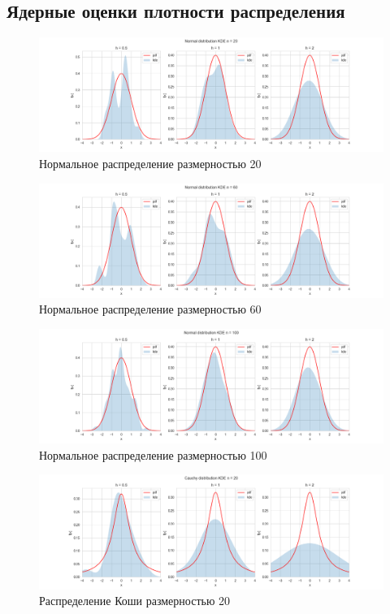 \documentclass[a4paper,14pt]{article}
\begin{document}
	\subsection{Ядерные оценки плотности распределения}
	\begin{figure}[H]
		\centering
		\includegraphics[scale=0.35]{../image/lab4/lab4_kde_norm_20.png}
		\caption{Нормальное распределение размерностью 20}
	\end{figure}
	
	\begin{figure}[H]
		\centering
		\includegraphics[scale=0.35]{../image/lab4/lab4_kde_norm_60.png}
		\caption{Нормальное распределение размерностью 60}
	\end{figure}
	
	\begin{figure}[H]
		\centering
		\includegraphics[scale=0.35]{../image/lab4/lab4_kde_norm_100.png}
		\caption{Нормальное распределение размерностью 100}
	\end{figure}
	
	\begin{figure}[H]
		\centering
		\includegraphics[scale=0.35]{../image/lab4/lab4_kde_cauchy_20.png}
		\caption{Распределение Коши размерностью 20}
	\end{figure}
	
\end{document}
